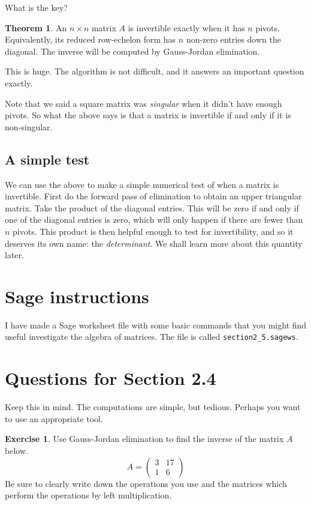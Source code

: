 \documentclass[11pt]{amsart}
\theoremstyle{definition}
\newtheorem{exercise}{Exercise}
\newtheorem*{theorem}{Theorem}
\begin{document}
What is the key?

\begin{theorem}
An $n\times n$ matrix $A$ is invertible exactly when it has $n$ pivots. Equivalently, its reduced row-echelon form has $n$ non-zero entries down the diagonal. The inverse will be computed by Gauss-Jordan elimination.
\end{theorem}

This is huge. The algorithm is not difficult, and it answers an important question exactly.


Note that we said a square matrix was \emph{singular} when it didn't have enough pivots. So what the above says is that a matrix is invertible if and only if it is non-singular.

\subsection{A simple test}

We can use the above to make a simple numerical test of when a matrix is invertible. First do the forward pass of elimination to obtain an upper triangular matrix. Take the product of the diagonal entries. This will be zero if and only if one of the diagonal entries is zero, which will only happen if there are fewer than $n$ pivots. This product is then helpful enough to test for invertibility, and so it deserves its own name: the \emph{determinant}. We shall learn more about this quantity later.


\section{Sage instructions}

I have made a Sage worksheet file with some basic commands that you might find useful investigate the algebra of  matrices. The file is called \texttt{section2\_5.sagews}.


\section{Questions for Section 2.4}
\setcounter{exercise}{58}

Keep this in mind. The computations are simple, but tedious. Perhaps you want to use an appropriate tool.

\begin{exercise}
Use Gauss-Jordan elimination to find the inverse of the matrix $A$ below.
\[
A = \begin{pmatrix} 3 & 17 \\ 1 & 6 \end{pmatrix}
\]
Be sure to clearly write down the operations you use and the matrices which perform the operations by left multiplication.
\end{exercise}
\end{document}
